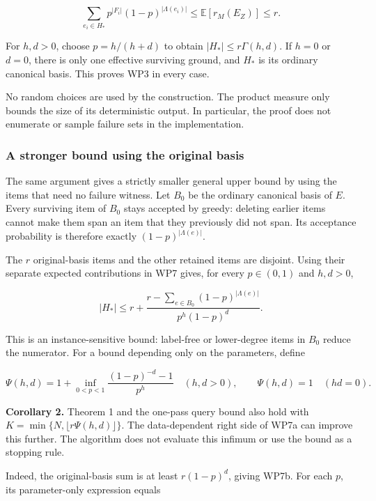 \[
\sum_{e_i\in H_*}
p^{|F_i|}(1-p)^{|\Lambda(e_i)|}
\le \mathbb E[r_M(E_Z)]\le r.
\tag{WP7}
\]

For \(h,d>0\), choose \(p=h/(h+d)\) to obtain \(|H_*|\le r\Gamma(h,d)\). If \(h=0\) or \(d=0\), there is only one effective surviving ground, and \(H_*\) is its ordinary canonical basis. This proves WP3 in every case.

No random choices are used by the construction. The product measure only bounds the size of its deterministic output. In particular, the proof does not enumerate or sample failure sets in the implementation.

\hypertarget{af-eb38c0014f-a-stronger-bound-using-the-original-basis}{%
\subsubsection{A stronger bound using the original basis}\label{af-eb38c0014f-a-stronger-bound-using-the-original-basis}}

The same argument gives a strictly smaller general upper bound by using the items that need no failure witness. Let \(B_0\) be the ordinary canonical basis of \(E\). Every surviving item of \(B_0\) stays accepted by greedy: deleting earlier items cannot make them span an item that they previously did not span. Its acceptance probability is therefore exactly \((1-p)^{|\Lambda(e)|}\).

The \(r\) original-basis items and the other retained items are disjoint. Using their separate expected contributions in WP7 gives, for every \(p\in(0,1)\) and \(h,d>0\),

\[
\boxed{
|H_*|\le r+
\frac{r-\displaystyle\sum_{e\in B_0}(1-p)^{|\Lambda(e)|}}
 {p^h(1-p)^d}.}
\tag{WP7a}
\]

This is an instance-sensitive bound: label-free or lower-degree items in \(B_0\) reduce the numerator. For a bound depending only on the parameters, define

\[
\Psi(h,d)=
1+\inf_{0<p<1}\frac{(1-p)^{-d}-1}{p^h}
\quad(h,d>0),
\qquad
\Psi(h,d)=1\quad(hd=0).
\tag{WP7b}
\]

\textbf{Corollary 2.} Theorem 1 and the one-pass query bound also hold with \(K=\min\{N,\lfloor r\Psi(h,d)\rfloor\}\). The data-dependent right side of WP7a can improve this further. The algorithm does not evaluate this infimum or use the bound as a stopping rule.

Indeed, the original-basis sum is at least \(r(1-p)^d\), giving WP7b. For each \(p\), its parameter-only expression equals

